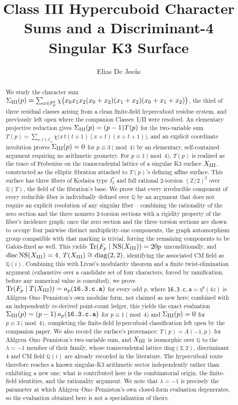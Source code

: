 \documentclass[11pt]{amsart}
\title{Class III Hypercuboid Character Sums and a Discriminant-4 Singular K3 Surface}
\author{Elias De Jes\'us}
\theoremstyle{definition}
\newcommand{\Fp}{\mathbb{F}_p}
\newcommand{\Q}{\mathbb{Q}}
\newcommand{\Z}{\mathbb{Z}}
\newcommand{\NS}{\mathrm{NS}}
\DeclareMathOperator{\Tr}{Tr}
\DeclareMathOperator{\disc}{disc}
\begin{document}
\pagestyle{plain}

\begin{abstract}
We study the character sum $\Sigma_{\rm III}(p)=\sum_{x\in\Fp^3}\chi\bigl(x_0x_1x_2(x_0+x_2)(x_1+x_2)(x_0+x_1+x_2)\bigr)$, the third of three residual classes arising from a clean finite-field hypercuboid residue system, and previously left open where the companion Classes~I/II were resolved. An elementary projective reduction gives $\Sigma_{\rm III}(p)=(p-1)T(p)$ for the two-variable sum $T(p)=\sum_{x,t\in\Fp}\chi\bigl(x\,t(t+1)(x+t)(x+t+1)\bigr)$, and an explicit coordinate involution proves $\Sigma_{\rm III}(p)=0$ for $p\equiv3\pmod4$ by an elementary, self-contained argument requiring no arithmetic geometry. For $p\equiv1\pmod4$, $T(p)$ is realized as the trace of Frobenius on the transcendental lattice of a singular K3 surface $X_{\rm III}$, constructed as the elliptic fibration attached to $T(p)$'s defining affine surface. This surface has three fibers of Kodaira type $I_2^*$ and full rational $2$-torsion $(\Z/2)^2$ over $\Q(T)$, the field of the fibration's base. We prove that every irreducible component of every reducible fiber is individually defined over $\Q$ by an argument that does not require an explicit resolution of any singular fiber -- combining the rationality of the zero section and the three nonzero $2$-torsion sections with a rigidity property of the fiber's incidence graph: once the zero section and the three torsion sections are shown to occupy four pairwise distinct multiplicity-one components, the graph automorphism group compatible with that marking is trivial, forcing the remaining components to be Galois-fixed as well. This yields $\Tr(F_p\mid\NS(X_{\rm III}))=20p$ unconditionally, and $\disc\NS(X_{\rm III})=4$, $T(X_{\rm III})\cong\mathrm{diag}(2,2)$, identifying the associated CM field as $\Q(i)$. Combining this with Livn\'e's modularity theorem and a finite twist-elimination argument (exhaustive over a candidate set of four characters, forced by ramification, before any numerical value is consulted), we prove $\Tr(F_p\mid T(X_{\rm III}))=a_p(\texttt{16.3.c.a})$ for every odd $p$, where \texttt{16.3.c.a}$=\eta^6(4z)$ is Ahlgren--Ono--Penniston's own modular form, not claimed as new here; combined with an independently re-derived point-count ledger, this yields the exact evaluation $\Sigma_{\rm III}(p)=(p-1)\,a_p(\texttt{16.3.c.a})$ for $p\equiv1\pmod4$ and $\Sigma_{\rm III}(p)=0$ for $p\equiv3\pmod4$, completing the finite-field hypercuboid classification left open by the companion paper. We also record the surface's provenance: $T(p)=A(-1,p)$ for Ahlgren--Ono--Penniston's two-variable sum, and $X_{\rm III}$ is isomorphic over $\Q$ to the $\lambda=-1$ member of their family, whose transcendental lattice $\mathrm{diag}(2,2)$, discriminant $4$ and CM field $\Q(i)$ are already recorded in the literature. The hypercuboid route therefore reaches a known singular-K3 arithmetic sector independently rather than exhibiting a new one; what is contributed here is the combinatorial origin, the finite-field identities, and the rationality argument. We note that $\lambda=-1$ is precisely the parameter at which Ahlgren--Ono--Penniston's own closed-form evaluation degenerates, so the evaluation obtained here is not a specialization of theirs.

\end{abstract}
\end{document}
